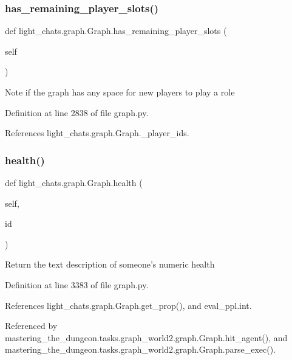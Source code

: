 \subsubsection{\texorpdfstring{has\+\_\+remaining\+\_\+player\+\_\+slots()}{has\_remaining\_player\_slots()}}
{\footnotesize\ttfamily def light\+\_\+chats.\+graph.\+Graph.\+has\+\_\+remaining\+\_\+player\+\_\+slots (\begin{DoxyParamCaption}\item[{}]{self }\end{DoxyParamCaption})}

\begin{DoxyVerb}Note if the graph has any space for new players to play a role\end{DoxyVerb}
 

Definition at line 2838 of file graph.\+py.



References light\+\_\+chats.\+graph.\+Graph.\+\_\+player\+\_\+ids.

\mbox{\label{classlight__chats_1_1graph_1_1Graph_a3709592a97b55342b767bedb9db16267}} 
\subsubsection{\texorpdfstring{health()}{health()}}
{\footnotesize\ttfamily def light\+\_\+chats.\+graph.\+Graph.\+health (\begin{DoxyParamCaption}\item[{}]{self,  }\item[{}]{id }\end{DoxyParamCaption})}

\begin{DoxyVerb}Return the text description of someone's numeric health\end{DoxyVerb}
 

Definition at line 3383 of file graph.\+py.



References light\+\_\+chats.\+graph.\+Graph.\+get\+\_\+prop(), and eval\+\_\+ppl.\+int.



Referenced by mastering\+\_\+the\+\_\+dungeon.\+tasks.\+graph\+\_\+world2.\+graph.\+Graph.\+hit\+\_\+agent(), and mastering\+\_\+the\+\_\+dungeon.\+tasks.\+graph\+\_\+world2.\+graph.\+Graph.\+parse\+\_\+exec().

